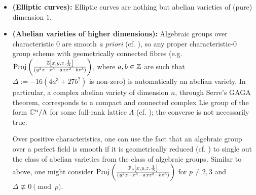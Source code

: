     \begin{example}
        \noindent
        \begin{itemize}
            \item \textbf{(Elliptic curves):} Elliptic curves are nothing but abelian varieties of (pure) dimension $1$. 
            \item \textbf{(Abelian varieties of higher dimensions):} Algebraic groups over characteristic $0$ are smooth \textit{a priori} (cf. \cite[\href{https://stacks.math.columbia.edu/tag/047N}{Tag 047N}]{stacks}), so any proper characteristic-$0$ group scheme with geometrically connected fibres (e.g. $\mathrm{Proj}\left(\frac{\mathbb{Z}\left[x, y, z, \frac{1}{\Delta}\right]}{(y^2z - x^3 - axz^2 - bz^3)}\right)$, where $a, b \in \mathbb{Z}$ are such that $\Delta := -16(4a^3 + 27b^2)$ is non-zero) is automatically an abelian variety. In particular, a complex abelian variety of dimension $n$, through Serre's GAGA theorem, corresponds to a compact and connected complex Lie group of the form $\mathbb{C}^n/\Lambda$ for some full-rank lattice $\Lambda$ (cf. \cite[Remark 1.9]{bhatt_abelian_varieties}); the converse is not necessarily true.
            
            Over positive characteristics, one can use the fact that an algebraic group over a perfect field is smooth if it is geometrically reduced (cf. \cite[\href{https://stacks.math.columbia.edu/tag/047P}{Tag 047P}]{stacks}) to single out the class of abelian varieties from the class of algebraic groups. Similar to above, one might consider $\mathrm{Proj}\left(\frac{\mathbb{F}_p\left[x, y, z, \frac{1}{\Delta}\right]}{(y^2z - x^3 - axz^2 - bz^3)}\right)$ for $p \not = 2, 3$ and $\Delta \not \equiv 0 \pmod{p}$.
        \end{itemize}
    \end{example}
    
